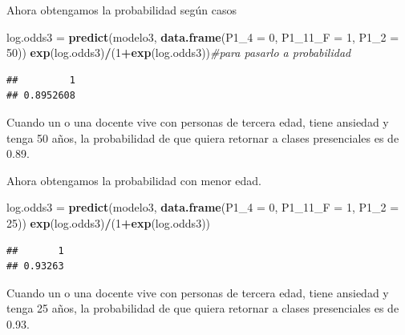 \documentclass[
]{article}
\newenvironment{Shaded}{\begin{snugshade}}{\end{snugshade}}
\newcommand{\AttributeTok}[1]{\textcolor[rgb]{0.13,0.29,0.53}{#1}}
\newcommand{\CommentTok}[1]{\textcolor[rgb]{0.56,0.35,0.01}{\textit{#1}}}
\newcommand{\DecValTok}[1]{\textcolor[rgb]{0.00,0.00,0.81}{#1}}
\newcommand{\FunctionTok}[1]{\textcolor[rgb]{0.13,0.29,0.53}{\textbf{#1}}}
\newcommand{\NormalTok}[1]{#1}
\newcommand{\OtherTok}[1]{\textcolor[rgb]{0.56,0.35,0.01}{#1}}
\newcommand{\SpecialCharTok}[1]{\textcolor[rgb]{0.81,0.36,0.00}{\textbf{#1}}}
\begin{document}
Ahora obtengamos la probabilidad según casos

\begin{Shaded}
\begin{Highlighting}[]
\NormalTok{log.odds3 }\OtherTok{=} \FunctionTok{predict}\NormalTok{(modelo3, }\FunctionTok{data.frame}\NormalTok{(}\AttributeTok{P1\_4 =} \DecValTok{0}\NormalTok{, }\AttributeTok{P1\_11\_F =} \DecValTok{1}\NormalTok{, }\AttributeTok{P1\_2 =} \DecValTok{50}\NormalTok{))}
\FunctionTok{exp}\NormalTok{(log.odds3)}\SpecialCharTok{/}\NormalTok{(}\DecValTok{1}\SpecialCharTok{+}\FunctionTok{exp}\NormalTok{(log.odds3))}\CommentTok{\#para pasarlo a probabilidad}
\end{Highlighting}
\end{Shaded}

\begin{verbatim}
##         1 
## 0.8952608
\end{verbatim}

Cuando un o una docente vive con personas de tercera edad, tiene
ansiedad y tenga 50 años, la probabilidad de que quiera retornar a
clases presenciales es de 0.89.

Ahora obtengamos la probabilidad con menor edad.

\begin{Shaded}
\begin{Highlighting}[]
\NormalTok{log.odds3 }\OtherTok{=} \FunctionTok{predict}\NormalTok{(modelo3, }\FunctionTok{data.frame}\NormalTok{(}\AttributeTok{P1\_4 =} \DecValTok{0}\NormalTok{, }\AttributeTok{P1\_11\_F =} \DecValTok{1}\NormalTok{, }\AttributeTok{P1\_2 =} \DecValTok{25}\NormalTok{))}
\FunctionTok{exp}\NormalTok{(log.odds3)}\SpecialCharTok{/}\NormalTok{(}\DecValTok{1}\SpecialCharTok{+}\FunctionTok{exp}\NormalTok{(log.odds3))}
\end{Highlighting}
\end{Shaded}

\begin{verbatim}
##       1 
## 0.93263
\end{verbatim}

Cuando un o una docente vive con personas de tercera edad, tiene
ansiedad y tenga 25 años, la probabilidad de que quiera retornar a
clases presenciales es de 0.93.
\end{document}
